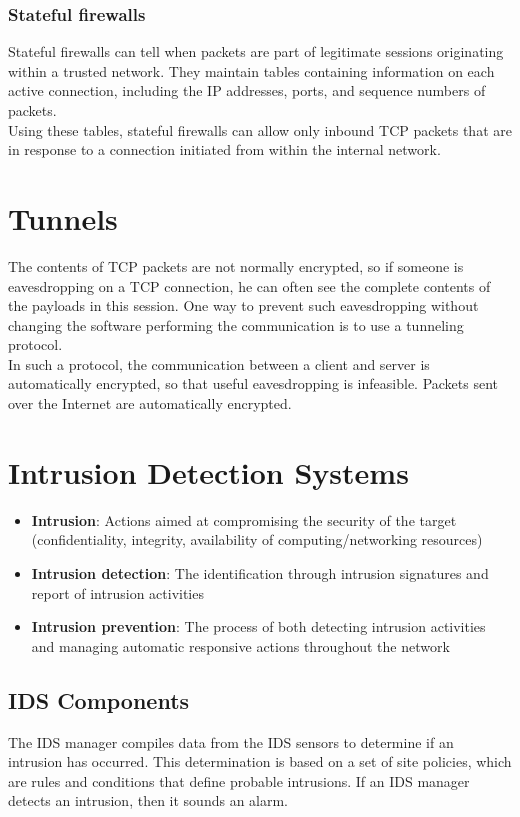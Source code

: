 \subsubsection{Stateful firewalls}
Stateful firewalls can tell when packets are part of legitimate sessions originating within a trusted network. They
maintain tables containing information on each active connection, including the IP addresses, ports, and sequence numbers of packets.\\
Using these tables, stateful firewalls can allow only inbound TCP packets that are in response to a connection initiated from within the internal network.
\section{Tunnels}
The contents of TCP packets are not normally encrypted, so if someone is eavesdropping on a TCP connection, he can often see the complete contents of the payloads in this session. One way to prevent such eavesdropping without
changing the software performing the communication is to use a tunneling protocol.\\
In such a protocol, the communication between a client and server is automatically encrypted, so that useful eavesdropping is infeasible. Packets sent over the Internet are automatically encrypted.
\section{Intrusion Detection Systems}
\begin{itemize}
\item \textbf{Intrusion}: Actions aimed at compromising the security of the target (confidentiality, integrity, availability of computing/networking resources)
\item \textbf{Intrusion detection}: The identification through intrusion signatures and report of intrusion activities
\item \textbf{Intrusion prevention}: The process of both detecting intrusion activities and managing automatic responsive actions throughout the network
\end{itemize}
\subsection{IDS Components}
The IDS manager compiles data from the IDS sensors to determine if an intrusion has occurred. This determination is based on a set of site policies, which are rules and conditions that define probable intrusions. If an IDS manager detects an intrusion, then it sounds an alarm.
